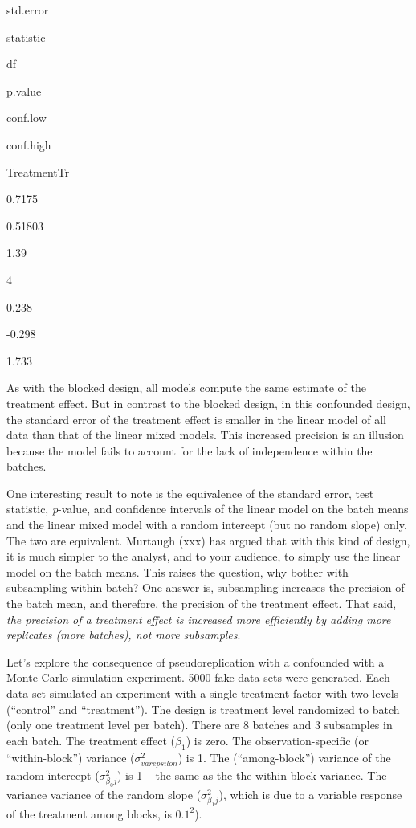 \documentclass[]{book}
\begin{document}
std.error

statistic

df

p.value

conf.low

conf.high

TreatmentTr

0.7175

0.51803

1.39

4

0.238

-0.298

1.733

As with the blocked design, all models compute the same estimate of the treatment effect. But in contrast to the blocked design, in this confounded design, the standard error of the treatment effect is smaller in the linear model of all data than that of the linear mixed models. This increased precision is an illusion because the model fails to account for the lack of independence within the batches.

One interesting result to note is the equivalence of the standard error, test statistic, \emph{p}-value, and confidence intervals of the linear model on the batch means and the linear mixed model with a random intercept (but no random slope) only. The two are equivalent. Murtaugh (xxx) has argued that with this kind of design, it is much simpler to the analyst, and to your audience, to simply use the linear model on the batch means. This raises the question, why bother with subsampling within batch? One answer is, subsampling increases the precision of the batch mean, and therefore, the precision of the treatment effect. That said, \emph{the precision of a treatment effect is increased more efficiently by adding more replicates (more batches), not more subsamples}.

Let's explore the consequence of pseudoreplication with a confounded with a Monte Carlo simulation experiment. 5000 fake data sets were generated. Each data set simulated an experiment with a single treatment factor with two levels (``control'' and ``treatment''). The design is treatment level randomized to batch (only one treatment level per batch). There are 8 batches and 3 subsamples in each batch. The treatment effect (\(\beta_1\)) is zero. The observation-specific (or ``within-block'') variance (\(\sigma^2_{varepsilon}\)) is 1. The (``among-block'') variance of the random intercept (\(\sigma^2_{\beta_0j}\)) is 1 -- the same as the the within-block variance. The variance variance of the random slope (\(\sigma^2_{\beta_1j}\)), which is due to a variable response of the treatment among blocks, is \(0.1^2\)).
\end{document}
